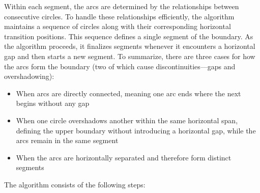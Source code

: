 \documentclass[12pt]{article}
\begin{document}
Within each segment, the arcs are determined by the relationships between consecutive circles. To handle these relationships efficiently, the algorithm maintains a sequence of circles along with their corresponding horizontal transition positions. This sequence defines a single segment of the boundary. As the algorithm proceeds, it finalizes segments whenever it encounters a horizontal gap and then starts a new segment. To summarize, there are three cases for how the arcs form the boundary (two of which cause discontinuities—gaps and overshadowing):
\begin{itemize}
	\item When arcs are directly connected, meaning one arc ends where the next begins without any gap
	\item When one circle overshadows another within the same horizontal span, defining the upper boundary without introducing a horizontal gap, while the arcs remain in the same segment
	\item When the arcs are horizontally separated and therefore form distinct segments
\end{itemize}

The algorithm consists of the following steps:
\end{document}
